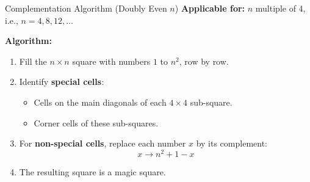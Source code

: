 \documentclass[11pt]{beamer}
\begin{document}
	\begin{frame}{Complementation Algorithm (Doubly Even $n$)}
		\textbf{Applicable for:} $n$ multiple of 4, i.e., $n=4,8,12,\dots$
		
		\textbf{Algorithm:}
		\begin{enumerate}
			\item Fill the $n \times n$ square with numbers $1$ to $n^2$, row by row.
			\item Identify \textbf{special cells}:
			\begin{itemize}
				\item Cells on the main diagonals of each $4 \times 4$ sub-square.
				\item Corner cells of these sub-squares.
			\end{itemize}
			\item For \textbf{non-special cells}, replace each number $x$ by its complement:
			\[
			x \to n^2 + 1 - x
			\]
			\item The resulting square is a magic square.
		\end{enumerate}
	\end{frame}
	
\end{document}
